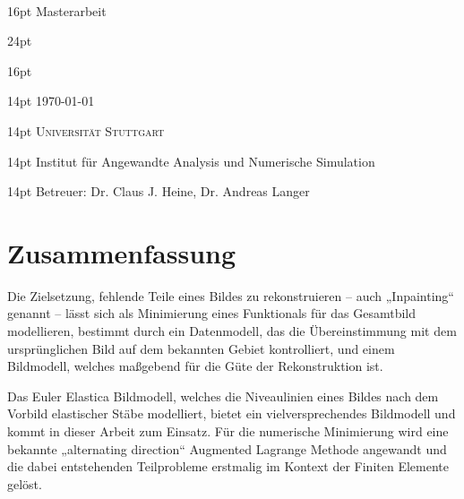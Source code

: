 
\begin{titlepage}
  \begin{center}
    ~\par\vspace{4em}
    {
      \fontsize { 16pt } { 16pt } \selectfont
      Masterarbeit
    }
    \par\vspace{3em}
    {
      \fontsize { 24pt } { 24pt } \selectfont \sffamily \bfseries
      \thetitle
    }
    \par\vspace{3em}
    {
      \fontsize { 16pt } { 16pt } \selectfont \scshape
      \theauthor
    }
    \par\vspace{1.5em}
    {
      \fontsize { 14pt } { 14pt } \selectfont %
      \today
    }
    \par\vspace{4.5em}
    {
    }
    \par\vspace{8em}
    {
      \fontsize { 14pt } { 14pt } \selectfont \scshape
      Universität Stuttgart
    }
    \par\vspace{1em}
    {
      \fontsize { 14pt } { 14pt } \selectfont %
      Institut für Angewandte Analysis und Numerische Simulation
    }
    \par\vspace{1em}
    {
      \fontsize { 14pt } { 14pt } \selectfont %
      Betreuer:
      Dr. Claus J. Heine,
      Dr. Andreas Langer
    }
  \end{center}
\end{titlepage}

\chapter*{Zusammenfassung}

Die Zielsetzung, fehlende Teile eines Bildes zu rekonstruieren – auch „Inpainting“ genannt – lässt sich als Minimierung eines
Funktionals für das Gesamtbild modellieren, bestimmt durch ein Datenmodell, das die Übereinstimmung mit dem ursprünglichen Bild auf dem bekannten Gebiet kontrolliert, und einem Bildmodell, welches maßgebend für die Güte der Rekonstruktion ist.

Das Euler Elastica Bildmodell, welches die Niveaulinien eines Bildes nach dem Vorbild elastischer Stäbe modelliert, bietet ein vielversprechendes Bildmodell und kommt in dieser Arbeit zum Einsatz.
Für die numerische Minimierung wird eine bekannte „alternating direction“ Augmented Lagrange Methode angewandt und die dabei entstehenden Teilprobleme erstmalig im Kontext der Finiten Elemente gelöst.


{
  \let\clearpage\relax
  \tableofcontents
}

